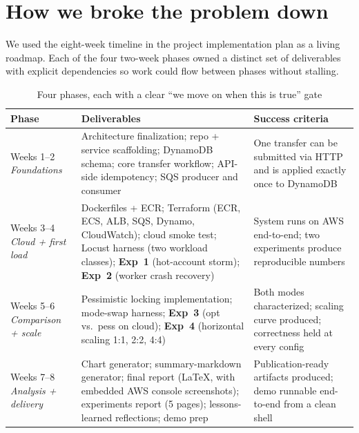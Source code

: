 \documentclass[11pt,a4paper]{article}
\begin{document}
\section{How we broke the problem down}

We used the eight-week timeline in the project implementation plan as a living roadmap. Each of the four two-week phases owned a distinct set of deliverables with explicit dependencies so work could flow between phases without stalling.

\begin{table}[h]
\centering
\small
\renewcommand{\arraystretch}{1.25}
\caption{Four phases, each with a clear ``we move on when this is true'' gate}
\label{tab:phases}
\begin{tabular}{>{\raggedright\arraybackslash}p{2.2cm} >{\raggedright\arraybackslash}p{7.3cm} >{\raggedright\arraybackslash}p{4.8cm}}
\toprule
\rowcolor{boxblue}
\textbf{Phase} & \textbf{Deliverables} & \textbf{Success criteria} \\
\midrule
Weeks 1--2 \newline \textit{Foundations} & Architecture finalization; repo + service scaffolding; DynamoDB schema; core transfer workflow; API-side idempotency; SQS producer and consumer & One transfer can be submitted via HTTP and is applied exactly once to DynamoDB \\
Weeks 3--4 \newline \textit{Cloud + first load} & Dockerfiles + ECR; Terraform (ECR, ECS, ALB, SQS, Dynamo, CloudWatch); cloud smoke test; Locust harness (two workload classes); \textbf{Exp~1} (hot-account storm); \textbf{Exp~2} (worker crash recovery) & System runs on AWS end-to-end; two experiments produce reproducible numbers \\
Weeks 5--6 \newline \textit{Comparison + scale} & Pessimistic locking implementation; mode-swap harness; \textbf{Exp~3} (opt vs.\ pess on cloud); \textbf{Exp~4} (horizontal scaling 1:1, 2:2, 4:4) & Both modes characterized; scaling curve produced; correctness held at every config \\
Weeks 7--8 \newline \textit{Analysis + delivery} & Chart generator; summary-markdown generator; final report (LaTeX, with embedded AWS console screenshots); experiments report (5 pages); lessons-learned reflections; demo prep & Publication-ready artifacts produced; demo runnable end-to-end from a clean shell \\
\bottomrule
\end{tabular}
\end{table}
\end{document}
